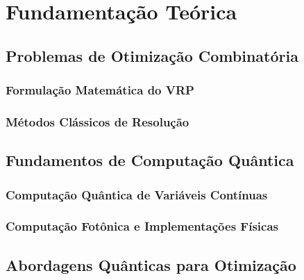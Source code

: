 \chapter{Fundamentação Teórica}

\section{Problemas de Otimização Combinatória}
\subsection{Formulação Matemática do VRP}
\subsection{Métodos Clássicos de Resolução}
\section{Fundamentos de Computação Quântica}
\subsection{Computação Quântica de Variáveis Contínuas}
\subsection{Computação Fotônica e Implementações Físicas}
\section{Abordagens Quânticas para Otimização}



